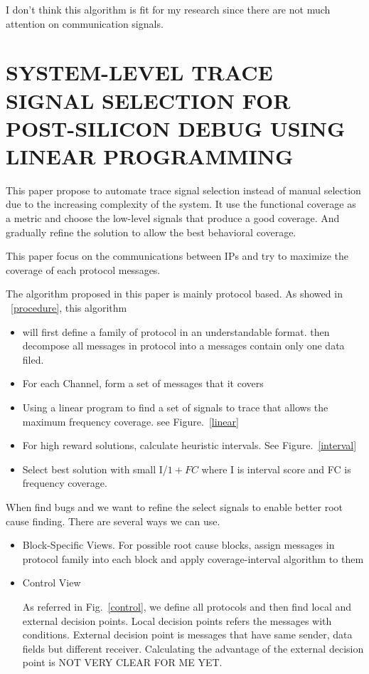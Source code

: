 \documentclass[conference]{IEEEtran}
\begin{document}
I don't think this algorithm is fit for my research since there are not much attention on communication signals. 




\section{SYSTEM-LEVEL TRACE SIGNAL SELECTION FOR POST-SILICON DEBUG USING LINEAR PROGRAMMING}
This paper propose to automate trace signal selection instead of manual selection due to the increasing complexity of the system. It use the functional coverage as a metric and choose the low-level signals that produce a good coverage. And gradually refine the solution to allow the best behavioral coverage. 

This paper focus on the communications between IPs and try to maximize the coverage of each protocol messages.

The algorithm proposed in this paper is mainly protocol based.  As showed in ~\ref{procedure}, this algorithm 
\begin{itemize}
\item will first define a family of protocol in an understandable format. then decompose all messages in protocol into a messages contain only one data filed. 
\item For each Channel, form a set of messages that it covers
\item Using a linear program to find a set of signals to trace that allows the maximum frequency coverage. see Figure.~\ref{linear}
\item For high reward solutions, calculate heuristic intervals. See Figure.~\ref{interval}
\item Select best solution with small I/\(1+FC\) where I is interval score and FC is frequency coverage.
\end{itemize}

When find bugs and we want to refine the select signals to enable better root cause finding. There are several ways we can use.
\begin{itemize}
\item Block-Specific Views. For possible root cause blocks, assign messages in protocol family into each block and apply coverage-interval algorithm to them
\item Control View

As referred in Fig.~\ref{control}, we define all protocols and then find local and external decision points. Local decision points refers the messages with conditions. External decision point is messages that have same sender, data fields but different receiver. Calculating the advantage of the external decision point is NOT VERY CLEAR FOR ME YET. 
\end{itemize}
\end{document}
